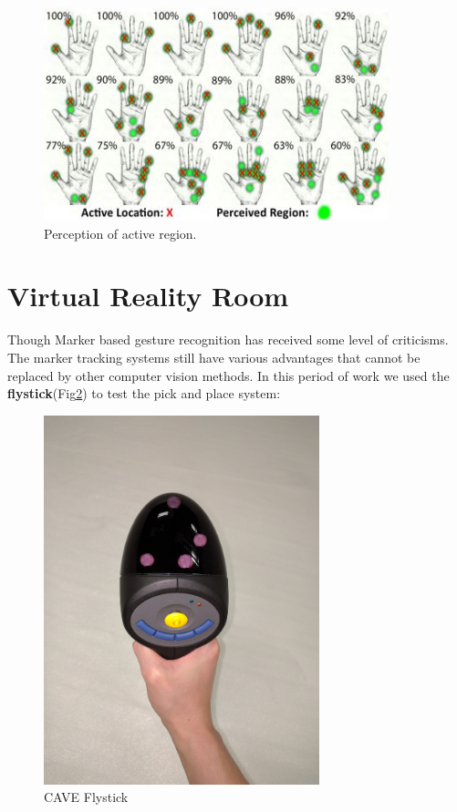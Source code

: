 \begin{figure}[!ht]
  \centering
  \includegraphics[width=10cm]{figures/figure6.jpg}
  \caption{Perception of active region.}
  \label{fig:glove-active}
\end{figure}


\section{Virtual Reality Room}

Though Marker based gesture recognition has received some level of
criticisms. The marker tracking systems still have various advantages
that cannot be replaced by other computer vision methods. In this
period of work we used the {\bf flystick}(Fig\ref{fig:flystick}) to
test the pick and place system:
\begin{figure}[!ht]
  \centering
  \includegraphics[width=8cm]{figures/flystick.jpg}
  \caption{CAVE Flystick}
  \label{fig:flystick}
\end{figure}

